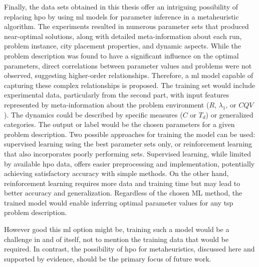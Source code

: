 Finally, the data sets obtained in this thesis offer an intriguing possibility of replacing \gls{hpo} by using \gls{ml} models for parameter inference in a metaheuristic algorithm. The experiments resulted in numerous parameter sets that produced near-optimal solutions, along with detailed meta-information about each run, problem instance, city placement properties, and dynamic aspects. While the problem description was found to have a significant influence on the optimal parameters, direct correlations between parameter values and problems were not observed, suggesting higher-order relationships. Therefore, a \gls{ml} model capable of capturing these complex relationships is proposed. The training set would include experimental data, particularly from the second part, with input features represented by meta-information about the problem environment ($R$, $\lambda_1$, or $CQV$). The dynamics could be described by specific measures ($C$ or $T_d$) or generalized categories. The output or label would be the chosen parameters for a given problem description. Two possible approaches for training the model can be used: supervised learning using the best parameter sets only, or reinforcement learning that also incorporates poorly performing sets. Supervised learning, while limited by available \gls{hpo} data, offers easier preprocessing and implementation, potentially achieving satisfactory accuracy with simple methods. On the other hand, reinforcement learning requires more data and training time but may lead to better accuracy and generalization. Regardless of the chosen ML method, the trained model would enable inferring optimal parameter values for any \gls{tsp} problem description.

However good this \glsdesc{ml} option might be, training such a model would be a challenge in and of itself, not to mention the training data that would be required. In contrast, the possibility of \gls{hpo} for metaheuristics, discussed here and supported by evidence, should be the primary focus of future work.